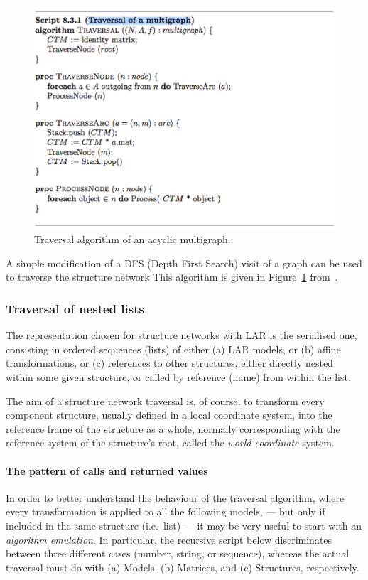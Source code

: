 \documentclass[11pt,oneside]{article}    %
\begin{document}
\begin{figure}[htbp] %
   \centering
   \includegraphics[width=0.8\linewidth]{images/traversal} 
   \caption{Traversal algorithm of an acyclic multigraph.}
   \label{fig:traversal}
\end{figure}

A simple modification of a DFS (Depth First Search) visit of a graph can be used to traverse the structure network This algorithm is given in Figure~\ref{fig:traversal} from~\cite{Paoluzzi2003a}. 

\subsubsection{Traversal of nested lists}

The representation chosen for structure networks with LAR is the serialised one, consisting in ordered sequences (lists) of either (a) LAR models, or (b) affine transformations, or (c) references to other structures, either directly nested within some given structure, or called by reference (name) from within the list.

The aim of a structure network traversal is, of course, to transform every component structure, usually defined in a local coordinate system, into the reference frame of the structure as a whole, normally corresponding with the reference system of the structure's root, called the \emph{world coordinate} system.

\paragraph{The pattern of calls and returned values}

In order to better understand the behaviour of the traversal algorithm, where every transformation is applied to all the following models, --- but only if included in the same structure  (i.e.~list) --- it may be very useful to start with an \emph{algorithm emulation}. In particular, the recursive script below discriminates between three different cases (number, string, or sequence), whereas the actual traversal must do with (a) Models, (b) Matrices, and (c) Structures, respectively.
\end{document}
